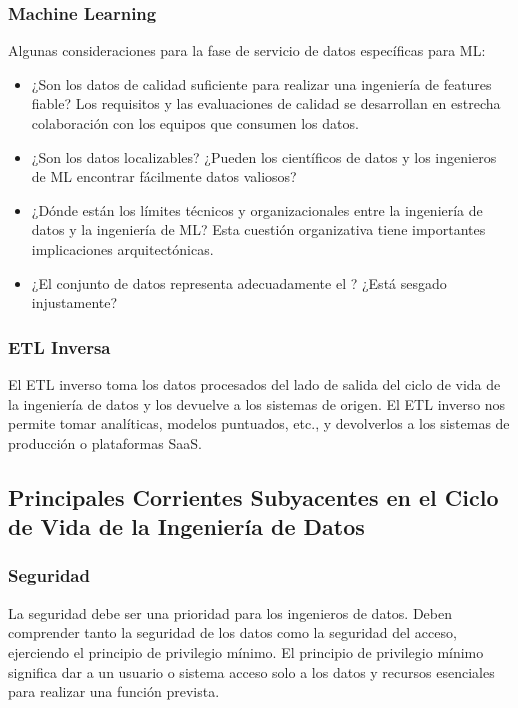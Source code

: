\documentclass[12pt]{book}
\begin{document}
\subsubsection{Machine Learning}
Algunas consideraciones para la fase de servicio de datos específicas para ML:
\begin{itemize}
    \item ¿Son los datos de calidad suficiente para realizar una ingeniería de features fiable? Los requisitos y las evaluaciones de calidad se desarrollan en estrecha colaboración con los equipos que consumen los datos.
    \item ¿Son los datos localizables? ¿Pueden los científicos de datos y los ingenieros de ML encontrar fácilmente datos valiosos?
    \item ¿Dónde están los límites técnicos y organizacionales entre la ingeniería de datos y la ingeniería de ML? Esta cuestión organizativa tiene importantes implicaciones arquitectónicas.
    \item ¿El conjunto de datos representa adecuadamente el ? ¿Está sesgado injustamente?
\end{itemize}

\subsubsection{ETL Inversa} %
El ETL inverso toma los datos procesados del lado de salida del ciclo de vida de la ingeniería de datos y los devuelve a los sistemas de origen. El ETL inverso nos permite tomar analíticas, modelos puntuados, etc., y devolverlos a los sistemas de producción o plataformas SaaS.

\subsection{Principales Corrientes Subyacentes en el Ciclo de Vida de la Ingeniería de Datos}

\subsubsection{Seguridad}
La seguridad debe ser una prioridad para los ingenieros de datos. Deben comprender tanto la seguridad de los datos como la seguridad del acceso, ejerciendo el principio de privilegio mínimo. El principio de privilegio mínimo significa dar a un usuario o sistema acceso solo a los datos y recursos esenciales para realizar una función prevista.
\end{document}
